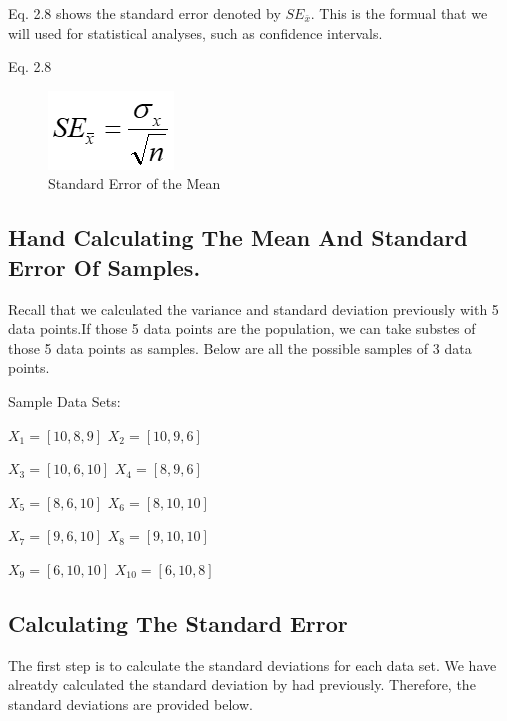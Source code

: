 \documentclass[]{book}
\theoremstyle{definition}
\theoremstyle{definition}
\theoremstyle{definition}
\theoremstyle{remark}
\begin{document}
Eq. 2.8 shows the standard error denoted by \(SE_{\bar{x}}\). This is
the formual that we will used for statistical analyses, such as
confidence intervals.

Eq. 2.8

\begin{figure}

{\centering \includegraphics[width=0.328\linewidth]{figures/Standard_Error_Mean_Equation} 

}

\caption{Standard Error of the Mean}\label{fig:std-err-mean}
\end{figure}

\hypertarget{hand-calculating-the-mean-and-standard-error-of-samples.}{%
\subsection{Hand Calculating The Mean And Standard Error Of
Samples.}\label{hand-calculating-the-mean-and-standard-error-of-samples.}}

Recall that we calculated the variance and standard deviation previously
with 5 data points.If those 5 data points are the population, we can
take substes of those 5 data points as samples. Below are all the
possible samples of 3 data points.

Sample Data Sets:

\(X_{1} = [10, 8, 9]\) \(X_{2} = [10, 9, 6]\)

\(X_{3} = [10, 6, 10]\) \(X_{4} = [8, 9, 6]\)

\(X_{5} = [8, 6, 10]\) \(X_{6} = [8, 10, 10]\)

\(X_{7} = [9, 6, 10]\) \(X_{8} = [9, 10, 10]\)

\(X_{9} = [6, 10, 10]\) \(X_{10} = [6, 10, 8]\)

\hypertarget{calculating-the-standard-error}{%
\subsection{Calculating The Standard
Error}\label{calculating-the-standard-error}}

The first step is to calculate the standard deviations for each data
set. We have alreatdy calculated the standard deviation by had
previously. Therefore, the standard deviations are provided below.
\end{document}
